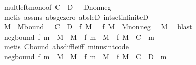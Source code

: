 \begin{isabellebody}
\ mult{\isacharunderscore}{\kern0pt}left{\isacharunderscore}{\kern0pt}mono{\isacharbrackleft}{\kern0pt}of\ {\isachardoublequoteopen}C\ {\isacharplus}{\kern0pt}\ D{\isachardoublequoteclose}\ {\isacharunderscore}{\kern0pt}\ {}{\isacharbrackright}{\kern0pt}\ D{\isacharunderscore}{\kern0pt}nonneg\ \isamarkupfalse%
\ {\isacharparenleft}{\kern0pt}metis\ assms{\isacharparenleft}{\kern0pt}{}{\isacharparenright}{\kern0pt}\ abs{\isacharunderscore}{\kern0pt}ge{\isacharunderscore}{\kern0pt}zero\ abs{\isacharunderscore}{\kern0pt}le{\isacharunderscore}{\kern0pt}D{}\ int{\isacharunderscore}{\kern0pt}set{\isacharunderscore}{\kern0pt}infiniteD{\isacharparenright}{\kern0pt}\isanewline
\ \ \ \ \isamarkupfalse%
\ \isamarkupfalse%
\ M\ \ M{\isacharunderscore}{\kern0pt}bound{\isacharcolon}{\kern0pt}\ {\isachardoublequoteopen}{}\ {\isacharasterisk}{\kern0pt}\ {\isacharparenleft}{\kern0pt}C\ {\isacharplus}{\kern0pt}\ D{\isacharparenright}{\kern0pt}\ {\isasymle}\ {\isasymbar}f\ M{\isasymbar}{\isachardoublequoteclose}\ {\isachardoublequoteopen}{}\ {\isacharless}{\kern0pt}\ f\ M{\isachardoublequoteclose}\ \ M{\isacharunderscore}{\kern0pt}nonneg{\isacharcolon}{\kern0pt}\ {\isachardoublequoteopen}{}\ {\isasymle}\ M{\isachardoublequoteclose}\ \isamarkupfalse%
\ blast\isanewline
\ \ \isanewline
\ \ \ \ \isamarkupfalse%
\ neg{\isacharunderscore}{\kern0pt}bound{\isacharcolon}{\kern0pt}\ {\isachardoublequoteopen}{\isacharparenleft}{\kern0pt}f\ {\isacharparenleft}{\kern0pt}m\ {\isacharasterisk}{\kern0pt}\ M\ {\isacharplus}{\kern0pt}\ M{\isacharparenright}{\kern0pt}\ {\isacharminus}{\kern0pt}\ {\isacharparenleft}{\kern0pt}f\ {\isacharparenleft}{\kern0pt}m\ {\isacharasterisk}{\kern0pt}\ M{\isacharparenright}{\kern0pt}\ {\isacharplus}{\kern0pt}\ f\ M{\isacharparenright}{\kern0pt}{\isacharparenright}{\kern0pt}\ {\isasymge}\ {\isacharminus}{\kern0pt}C{\isachardoublequoteclose}\ \ m\ \isamarkupfalse%
\ {\isacharparenleft}{\kern0pt}metis\ C{\isacharunderscore}{\kern0pt}bound\ abs{\isacharunderscore}{\kern0pt}diff{\isacharunderscore}{\kern0pt}le{\isacharunderscore}{\kern0pt}iff\ minus{\isacharunderscore}{\kern0pt}int{\isacharunderscore}{\kern0pt}code{\isacharparenleft}{\kern0pt}{}{\isacharcomma}{\kern0pt}{}{\isacharparenright}{\kern0pt}{\isacharparenright}{\kern0pt}\isanewline
\ \ \ \ \isamarkupfalse%
\ neg{\isacharunderscore}{\kern0pt}bound{\isacharprime}{\kern0pt}{\isacharcolon}{\kern0pt}\ {\isachardoublequoteopen}{\isacharparenleft}{\kern0pt}f\ {\isacharparenleft}{\kern0pt}m\ {\isacharasterisk}{\kern0pt}\ M\ {\isacharplus}{\kern0pt}\ M{\isacharparenright}{\kern0pt}\ {\isacharminus}{\kern0pt}\ {\isacharparenleft}{\kern0pt}f\ {\isacharparenleft}{\kern0pt}m\ {\isacharasterisk}{\kern0pt}\ M{\isacharparenright}{\kern0pt}\ {\isacharplus}{\kern0pt}\ f\ M{\isacharparenright}{\kern0pt}{\isacharparenright}{\kern0pt}\ {\isasymge}\ {\isacharminus}{\kern0pt}{\isacharparenleft}{\kern0pt}C\ {\isacharplus}{\kern0pt}\ D{\isacharparenright}{\kern0pt}{\isachardoublequoteclose}\ \ m\ \isamarkupfalse%

\end{isabellebody}
